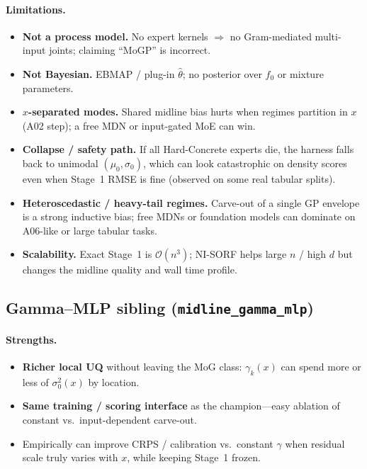 \documentclass[11pt,a4paper]{article}
\theoremstyle{definition}
\begin{document}
\paragraph{Limitations.}
\begin{itemize}[leftmargin=1.2em,itemsep=2pt]
\item \textbf{Not a process model.} No expert kernels $\Rightarrow$ no
  Gram-mediated multi-input joints; claiming ``MoGP'' is incorrect.
\item \textbf{Not Bayesian.} EBMAP / plug-in $\hat\theta$; no posterior over
  $f_0$ or mixture parameters.
\item \textbf{$x$-separated modes.} Shared midline bias hurts when regimes
  partition in $x$ (A02 step); a free MDN or input-gated MoE can win.
\item \textbf{Collapse / safety path.} If all Hard-Concrete experts die, the
  harness falls back to unimodal $(\mu_0,\sigma_0)$, which can look catastrophic
  on density scores even when Stage~1 RMSE is fine (observed on some real tabular
  splits).
\item \textbf{Heteroscedastic / heavy-tail regimes.} Carve-out of a single GP
  envelope is a strong inductive bias; free MDNs or foundation models can dominate
  on A06-like or large tabular tasks.
\item \textbf{Scalability.} Exact Stage~1 is $\mathcal{O}(n^3)$; NI-SORF helps
  large $n$ / high $d$ but changes the midline quality and wall time profile.
\end{itemize}

\subsection{Gamma--MLP sibling (\texttt{midline\_gamma\_mlp})}

\paragraph{Strengths.}
\begin{itemize}[leftmargin=1.2em,itemsep=2pt]
\item \textbf{Richer local UQ} without leaving the MoG class: $\gamma_k(x)$ can
  spend more or less of $\sigma_0^2(x)$ by location.
\item \textbf{Same training / scoring interface} as the champion---easy ablation
  of constant vs.\ input-dependent carve-out.
\item Empirically can improve CRPS / calibration vs.\ constant $\gamma$ when
  residual scale truly varies with $x$, while keeping Stage~1 frozen.
\end{itemize}
\end{document}
